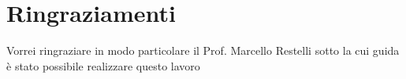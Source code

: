 
\bigskip

\begingroup
\let\clearpage\relax
\let\cleardoublepage\relax
\let\cleardoublepage\relax
\chapter*{Ringraziamenti}
Vorrei ringraziare in modo particolare il Prof. Marcello Restelli sotto la cui guida è stato possibile realizzare questo lavoro

\endgroup